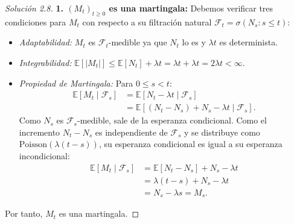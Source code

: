 \documentclass[10pt,a4paper]{article}
\begin{document}
\begin{proof}[Solución 2.8]
    \textbf{1. $(M_t)_{t\ge 0}$ es una martingala:}
    Debemos verificar tres condiciones para $M_t$ con respecto a su filtración natural $\mathcal{F}_t = \sigma(N_s : s \le t)$:
    \begin{itemize}
        \item \textit{Adaptabilidad:} $M_t$ es $\mathcal{F}_t$-medible ya que $N_t$ lo es y $\lambda t$ es determinista.
        \item \textit{Integrabilidad:} $\mathbb{E}[|M_t|] \le \mathbb{E}[N_t] + \lambda t = \lambda t + \lambda t = 2\lambda t < \infty$.
        \item \textit{Propiedad de Martingala:} Para $0 \le s < t$:
        \begin{align*}
            \mathbb{E}[M_t \mid \mathcal{F}_s] &= \mathbb{E}[N_t - \lambda t \mid \mathcal{F}_s] \\
            &= \mathbb{E}[(N_t - N_s) + N_s - \lambda t \mid \mathcal{F}_s].
        \end{align*}
        Como $N_s$ es $\mathcal{F}_s$-medible, sale de la esperanza condicional. Como el incremento $N_t - N_s$ es independiente de $\mathcal{F}_s$ y se distribuye como $\text{Poisson}(\lambda(t-s))$, su esperanza condicional es igual a su esperanza incondicional:
        \begin{align*}
            \mathbb{E}[M_t \mid \mathcal{F}_s] &= \mathbb{E}[N_t - N_s] + N_s - \lambda t \\
            &= \lambda(t-s) + N_s - \lambda t \\
            &= N_s - \lambda s = M_s.
        \end{align*}
    \end{itemize}
    Por tanto, $M_t$ es una martingala.


\end{proof}
\end{document}
